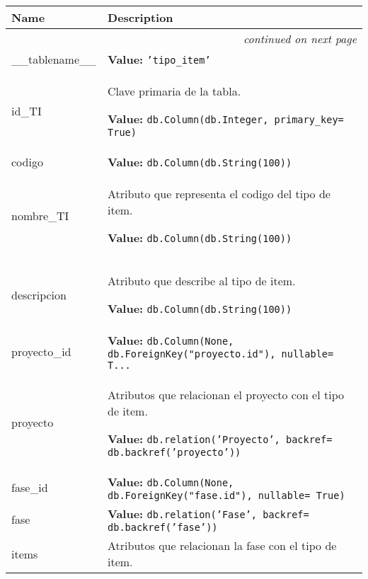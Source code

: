     \vspace{-1cm}
\hspace{\varindent}\begin{longtable}{|p{\varnamewidth}|p{\vardescrwidth}|l}
\cline{1-2}
\cline{1-2} \centering \textbf{Name} & \centering \textbf{Description}& \\
\cline{1-2}
\endhead\cline{1-2}\multicolumn{3}{r}{\small\textit{continued on next page}}\\\endfoot\cline{1-2}
\endlastfoot\raggedright \_\-\_\-t\-a\-b\-l\-e\-n\-a\-m\-e\-\_\-\_\- & \raggedright \textbf{Value:} 
{\tt \texttt{'}\texttt{tipo\_item}\texttt{'}}&\\
\cline{1-2}
\raggedright i\-d\-\_\-T\-I\- & \raggedright Clave primaria de la tabla.

\textbf{Value:} 
{\tt db.Column(db.Integer, primary\_key= True)}&\\
\cline{1-2}
\raggedright c\-o\-d\-i\-g\-o\- & \raggedright \textbf{Value:} 
{\tt db.Column(db.String(100))}&\\
\cline{1-2}
\raggedright n\-o\-m\-b\-r\-e\-\_\-T\-I\- & \raggedright Atributo que representa el codigo del tipo de item.

\textbf{Value:} 
{\tt db.Column(db.String(100))}&\\
\cline{1-2}
\raggedright d\-e\-s\-c\-r\-i\-p\-c\-i\-o\-n\- & \raggedright Atributo que describe al tipo de item.

\textbf{Value:} 
{\tt db.Column(db.String(100))}&\\
\cline{1-2}
\raggedright p\-r\-o\-y\-e\-c\-t\-o\-\_\-i\-d\- & \raggedright \textbf{Value:} 
{\tt db.Column(None, db.ForeignKey("proyecto.id"), nullable= T\texttt{...}}&\\
\cline{1-2}
\raggedright p\-r\-o\-y\-e\-c\-t\-o\- & \raggedright Atributos que relacionan el proyecto con el tipo de item.

\textbf{Value:} 
{\tt db.relation('Proyecto', backref= db.backref('proyecto'))}&\\
\cline{1-2}
\raggedright f\-a\-s\-e\-\_\-i\-d\- & \raggedright \textbf{Value:} 
{\tt db.Column(None, db.ForeignKey("fase.id"), nullable= True)}&\\
\cline{1-2}
\raggedright f\-a\-s\-e\- & \raggedright \textbf{Value:} 
{\tt db.relation('Fase', backref= db.backref('fase'))}&\\
\cline{1-2}
\raggedright i\-t\-e\-m\-s\- & \raggedright Atributos que relacionan la fase con el tipo de item.


\end{longtable}
